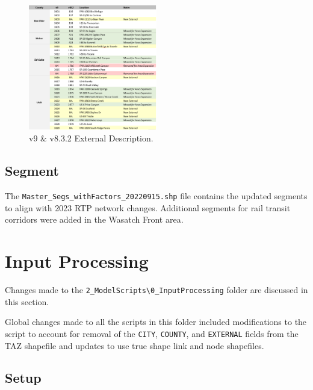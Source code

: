 \documentclass[
  letterpaper,
  DIV=11,
  numbers=noendperiod,
  titlepage=false]{scrreprt}
\begin{document}
\begin{figure}[H]

{\centering \includegraphics[width=0.5\textwidth,height=\textheight]{v9x/v900/whats-new/_pictures/ex_descrip3.png}

}

\caption{\label{fig-descrip3}v9 \& v8.3.2 External Description.}

\end{figure}

\hypertarget{segment}{%
\section{Segment}\label{segment}}

The \texttt{Master\_Segs\_withFactors\_20220915.shp} file contains the
updated segments to align with 2023 RTP network changes. Additional
segments for rail transit corridors were added in the Wasatch Front
area.


\hypertarget{input-processing}{%
\chapter{Input Processing}\label{input-processing}}

Changes made to the
\texttt{2\_ModelScripts\textbackslash{}0\_InputProcessing} folder are
discussed in this section.

Global changes made to all the scripts in this folder included
modifications to the script to account for removal of the \texttt{CITY},
\texttt{COUNTY}, and \texttt{EXTERNAL} fields from the TAZ shapefile and
updates to use true shape link and node shapefiles.

\hypertarget{setup}{%
\section{Setup}\label{setup}}
\end{document}
